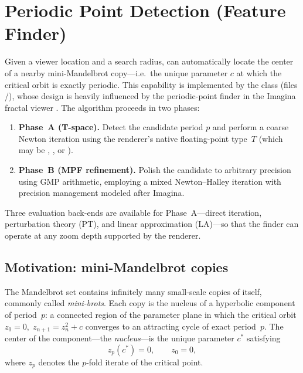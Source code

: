 \section{Periodic Point Detection (Feature Finder)}
\label{sec:feature-finder}

Given a viewer location and a search radius, \FractalShark{} can automatically
locate the center of a nearby mini-Mandelbrot copy---i.e.\ the unique parameter
$c$ at which the critical orbit is exactly periodic.  This capability is
implemented by the  class (files
/), whose design is heavily
influenced by the periodic-point finder in the Imagina fractal viewer \cite{Imagina}.  The
algorithm proceeds in two phases:
\begin{enumerate}
\item \textbf{Phase~A (T-space).}
  Detect the candidate period $p$ and perform a coarse Newton iteration using
  the renderer's native floating-point type~$T$ (which may be ,
  , or ).
\item \textbf{Phase~B (MPF refinement).}
  Polish the candidate to arbitrary precision using GMP 
  arithmetic, employing a mixed Newton--Halley iteration with precision
  management modeled after Imagina.
\end{enumerate}
Three evaluation back-ends are available for Phase~A---direct iteration,
perturbation theory (PT), and linear approximation (LA)---so that the finder
can operate at any zoom depth supported by the renderer.

\subsection{Motivation: mini-Mandelbrot copies}
\label{subsec:ff-motivation}

The Mandelbrot set contains infinitely many small-scale copies of itself,
commonly called \emph{mini-brots}.  Each copy is the nucleus of a hyperbolic
component of period~$p$: a connected region of the parameter plane in which the
critical orbit $z_0=0,\;z_{n+1}=z_n^2+c$ converges to an attracting cycle of
exact period~$p$.  The center of the component---the \emph{nucleus}---is the
unique parameter $c^*$ satisfying
\begin{equation}\label{eq:ff-nucleus}
z_p(c^*) = 0,\qquad z_0 = 0,
\end{equation}
where $z_p$ denotes the $p$-fold iterate of the critical point.

